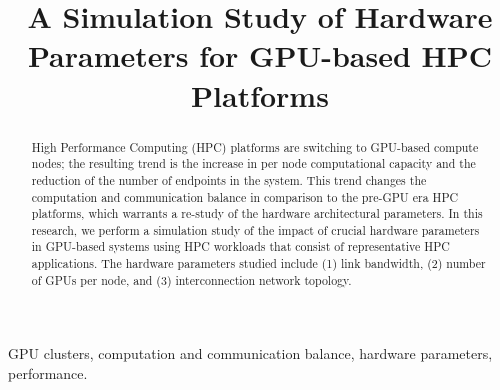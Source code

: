 \documentclass[conference]{IEEEtran}
\begin{document}
\title{A Simulation Study of Hardware Parameters for GPU-based HPC Platforms
}

\author{
\and
{}
\and
{}
\and
{}
}

\maketitle

\begin{abstract}
  High Performance Computing (HPC) platforms are switching to GPU-based compute nodes;
  the resulting trend is the increase in per node computational capacity
  and the reduction of the number of endpoints in the system. This trend changes the
  computation and communication balance in comparison to the pre-GPU era HPC platforms,
  which warrants a re-study of the hardware architectural parameters. In this research,
  we perform a simulation study of the impact of crucial hardware  parameters
  in GPU-based systems using HPC workloads that consist of representative
  HPC applications. The hardware parameters studied include (1) link bandwidth, (2) number
  of GPUs per node, and (3) interconnection network topology.
%  
\end{abstract}

\begin{IEEEkeywords}
  GPU clusters, computation and communication balance, hardware parameters, performance. 
\end{IEEEkeywords}
\end{document}
